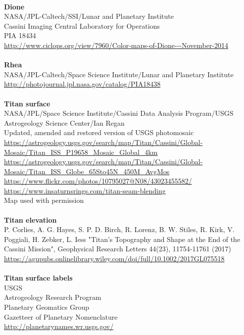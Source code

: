 \documentclass[Orbiter User Manual.tex]{subfiles}
\begin{document}
\\
\textbf{Dione}\\
NASA/JPL-Caltech/SSI/Lunar and Planetary Institute\\
Cassini Imaging Central Laboratory for Operations\\
PIA 18434\\
\url{http://www.ciclops.org/view/7960/Color-maps-of-Dione---November-2014}\\
\\
\textbf{Rhea}\\
NASA/JPL-Caltech/Space Science Institute/Lunar and Planetary Institute\\
\url{http://photojournal.jpl.nasa.gov/catalog/PIA18438}\\
\\
\textbf{Titan surface}\\
NASA/JPL/Space Science Institute/Cassini Data Analysis Program/USGS Astrogeology Science Center/Ian Regan\\
Updated, amended and restored version of USGS photomosaic\\
\url{https://astrogeology.usgs.gov/search/map/Titan/Cassini/Global-Mosaic/Titan_ISS_P19658_Mosaic_Global_4km}\\
\url{https://astrogeology.usgs.gov/search/map/Titan/Cassini/Global-Mosaic/Titan_ISS_Globe_65Sto45N_450M_AvgMos}\\
\url{https://www.flickr.com/photos/10795027@N08/43023455582/}\\
\url{https://www.insaturnsrings.com/titan-seam-blending}\\
Map used with permission\\
\\
\textbf{Titan elevation}\\
P. Corlies, A. G. Hayes, S. P. D. Birch, R. Lorenz, B. W. Stiles, R. Kirk, V. Poggiali, H. Zebker, L. Iess "Titan's Topography and Shape at the End of the Cassini Mission", Geophysical Research Letters 44(23), 11754-11761 (2017)\\
\url{https://agupubs.onlinelibrary.wiley.com/doi/full/10.1002/2017GL075518}\\
\\
\textbf{Titan surface labels}\\
USGS\\
Astrogeology Research Program\\
Planetary Geomatics Group\\
Gazetteer of Planetary Nomenclature\\
\url{http://planetarynames.wr.usgs.gov/}\\
\end{document}
